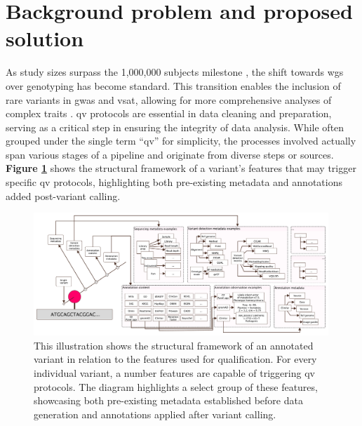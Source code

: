 \section{Background problem and proposed solution}

As study sizes surpass the 1,000,000 subjects milestone \cite{lee2018gene, jansen2019genome}, the shift towards \ac{wgs} over genotyping has become standard. 
This transition enables the inclusion of rare variants in \ac{gwas} and \ac{vsat}, allowing for more comprehensive analyses of complex traits \cite{manolio2009finding, young2019solving}. %
\ac{qv} protocols are essential in data cleaning and preparation, serving as a critical step in ensuring the integrity of data analysis. 
While often grouped under the single term ``\ac{qv}'' for simplicity, the processes involved actually span various stages of a pipeline and originate from diverse steps or sources.
\textbf{Figure 
\ref{fig:qv_structure_vcurrent}}
shows the structural framework of a variant's features that may trigger specific \ac{qv} protocols, highlighting both pre-existing metadata and annotations added post-variant calling.

\begin{figure}[h!]
\centering
     \includegraphics[width=0.99\textwidth]{./images/qv_structure_vcurrent.pdf}
\caption{This illustration shows the structural framework of an annotated variant in relation to the features used for qualification. For every individual variant, a number features are capable of triggering \ac{qv} protocols. The diagram highlights a select group of these features, showcasing both pre-existing metadata established before data generation and annotations applied after variant calling.}
\label{fig:qv_structure_vcurrent}
\end{figure}

